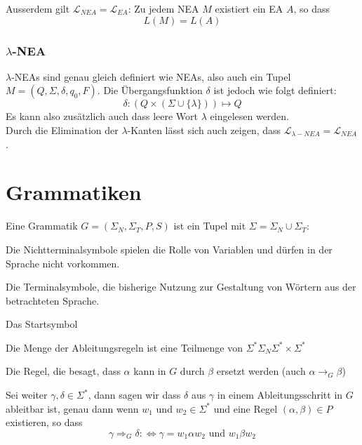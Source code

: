 \documentclass[11pt]{article}
\begin{document}
Ausserdem gilt $\mathcal{L}_{NEA} = \mathcal{L}_{EA}$: Zu jedem NEA $M$ existiert ein EA $A$, so dass
\begin{equation*}
	L(M) = L(A)
\end{equation*}

\subsubsection{$\lambda$-NEA}

$\lambda$-NEAs sind genau gleich definiert wie NEAs, also auch ein Tupel $M = (Q, \Sigma, \delta, q_0, F)$. Die Übergangsfunktion $\delta$ ist jedoch wie folgt definiert:
\begin{equation*}
	\delta: (Q\times(\Sigma \cup \{\lambda\})) \mapsto Q
\end{equation*}
Es kann also zusätzlich auch dass leere Wort $\lambda$ eingelesen werden. \\

Durch die Elimination der $\lambda$-Kanten lässt sich auch zeigen, dass $\mathcal{L}_{\lambda-NEA} = \mathcal{L}_{NEA}$.

\section{Grammatiken}

Eine Grammatik $G = (\Sigma_N, \Sigma_T, P, S)$ ist ein Tupel mit $\Sigma = \Sigma_N \cup \Sigma_T$:

\begin{description}[labelindent=16pt,style=multiline,leftmargin=3cm, noitemsep]
	\item[$\Sigma_N$:] Die Nichtterminalsymbole spielen die Rolle von Variablen und dürfen in der Sprache nicht vorkommen.
	\item[$\Sigma_T$:] Die Terminalsymbole, die bisherige Nutzung zur Gestaltung von Wörtern aus der betrachteten Sprache.
	\item[$S \in \Sigma_N$:] Das Startsymbol
	\item[$P$:] Die Menge der Ableitungsregeln ist eine Teilmenge von $\Sigma^*\Sigma_N\Sigma^* \times \Sigma^*$
	\item[$(\alpha, \beta) \in P$:] Die Regel, die besagt, dass $\alpha$ kann in $G$ durch $\beta$ ersetzt werden (auch $\alpha \rightarrow_G \beta$)
\end{description}

Sei weiter $\gamma, \delta \in \Sigma^*$, dann sagen wir dass $\delta$ aus $\gamma$ in einem Ableitungsschritt in $G$ ableitbar ist, genau dann wenn $w_1$ und $w_2 \in \Sigma^*$ und eine Regel $(\alpha, \beta) \in P$ existieren, so dass
\begin{equation*}
	\gamma \Rightarrow_G \delta :\Leftrightarrow \gamma = w_1\alpha w_2 \text{ und } w_1\beta w_2
\end{equation*}
\end{document}
